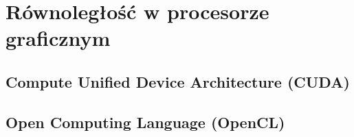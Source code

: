 \chapter{Równoległość w procesorze graficznym}

\section{Compute Unified Device Architecture (CUDA)}

\section{Open Computing Language (OpenCL)}


